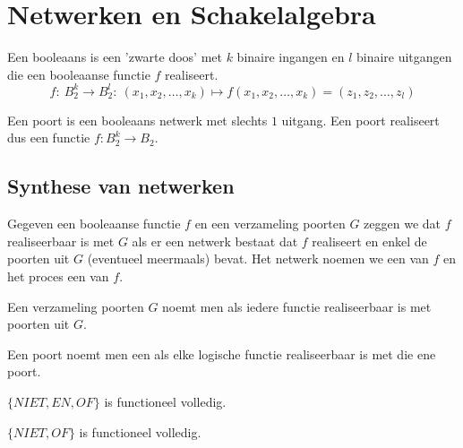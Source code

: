 \documentclass[main.tex]{subfiles}
\begin{document}
\section{Netwerken en Schakelalgebra}
\label{sec:netw-en-schak}

\begin{de}
  Een booleaans  is een 'zwarte doos' met $k$ binaire ingangen en $l$ binaire uitgangen die een booleaanse functie $f$ realiseert.
  \[ f:\ B_{2}^{k} \rightarrow B_{2}^{l}:\ (x_{1},x_{2},\dotsc,x_{k}) \mapsto f(x_{1},x_{2},\dotsc,x_{k}) = (z_{1},z_{2},\dotsc,z_{l})\]
\end{de}

\begin{de}
  Een poort is een booleaans netwerk met slechts $1$ uitgang.
  Een poort realiseert dus een functie $f:B_{2}^{k} \rightarrow B_{2}$.
\end{de}



\subsection{Synthese van netwerken}
\label{sec:synth-van-netw}

\begin{de}
  Gegeven een booleaanse functie $f$ en een verzameling poorten $G$ zeggen we dat $f$ realiseerbaar is met $G$ als er een netwerk bestaat dat $f$ realiseert en enkel de poorten uit $G$ (eventueel meermaals) bevat.
  Het netwerk noemen we een  van $f$ en het proces een  van $f$.
\end{de}

\begin{de}
  Een verzameling poorten $G$ noemt men  als iedere functie realiseerbaar is met poorten uit $G$.
\end{de}

\begin{de}
  Een poort noemt men een  als elke logische functie realiseerbaar is met die ene poort.
\end{de}

\begin{st}
  $\{NIET,EN,OF\}$ is functioneel volledig.
\end{st}

\begin{st}
  $\{NIET,OF\}$ is functioneel volledig.
\end{st}
\end{document}
